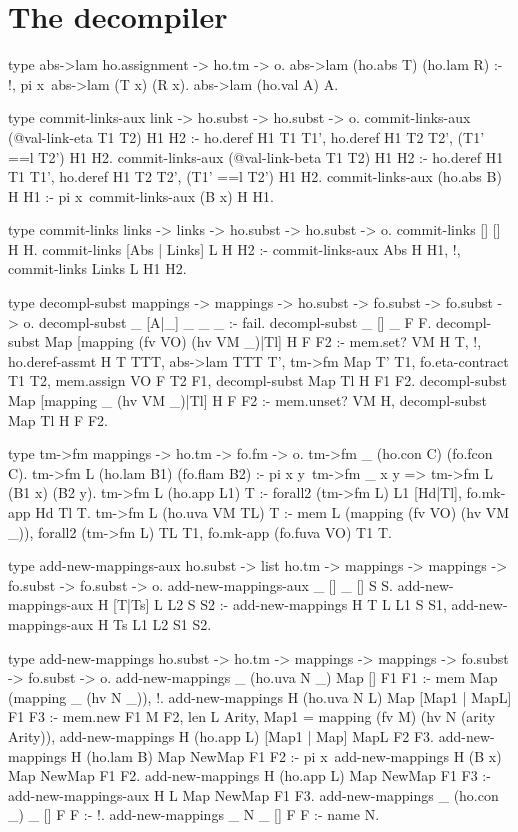 \section{The decompiler}

\begin{elpicode}
  
  type abs->lam ho.assignment -> ho.tm -> o.
  abs->lam (ho.abs T) (ho.lam R)  :- !, pi x\ abs->lam (T x) (R x).
  abs->lam (ho.val A) A.

  type commit-links-aux link -> ho.subst -> ho.subst -> o.
  commit-links-aux (@val-link-eta T1 T2) H1 H2 :- 
    ho.deref H1 T1 T1', ho.deref H1 T2 T2',
    (T1' ==l T2') H1 H2.
  commit-links-aux (@val-link-beta T1 T2) H1 H2 :- 
    ho.deref H1 T1 T1', ho.deref H1 T2 T2',
    (T1' ==l T2') H1 H2.
  commit-links-aux (ho.abs B) H H1 :- 
    pi x\ commit-links-aux (B x) H H1.

  type commit-links links -> links -> ho.subst -> ho.subst -> o.
  commit-links [] [] H H.
  commit-links [Abs | Links] L H H2 :- 
    commit-links-aux Abs H H1, !, commit-links Links L H1 H2.

  type decompl-subst mappings -> mappings -> ho.subst -> 
    fo.subst -> fo.subst -> o.
  decompl-subst _ [A|_] _ _ _ :- fail.
  decompl-subst _ [] _ F F.
  decompl-subst Map [mapping (fv VO) (hv VM _)|Tl] H F F2 :- 
    mem.set? VM H T, !, 
    ho.deref-assmt H T TTT,
    abs->lam TTT T', tm->fm Map T' T1, 
    fo.eta-contract T1 T2, mem.assign VO F T2 F1,
    decompl-subst Map Tl H F1 F2. 
  decompl-subst Map [mapping _ (hv VM _)|Tl] H F F2 :- 
    mem.unset? VM H, decompl-subst Map Tl H F F2.

  type tm->fm mappings -> ho.tm -> fo.fm -> o.
  tm->fm _ (ho.con C)  (fo.fcon C).
  tm->fm L (ho.lam B1) (fo.flam B2) :- 
    pi x y\ tm->fm _ x y => tm->fm L (B1 x) (B2 y).
  tm->fm L (ho.app L1) T :- forall2 (tm->fm L) L1 [Hd|Tl], 
    fo.mk-app Hd Tl T.
  tm->fm L (ho.uva VM TL) T :- mem L (mapping (fv VO) (hv VM _)), 
    forall2 (tm->fm L) TL T1, fo.mk-app (fo.fuva VO) T1 T.

  type add-new-mappings-aux ho.subst -> list ho.tm -> mappings -> 
        mappings ->  fo.subst -> fo.subst -> o.
  add-new-mappings-aux _ [] _ [] S S.
  add-new-mappings-aux H [T|Ts] L L2 S S2 :- 
    add-new-mappings H T L L1 S S1, 
    add-new-mappings-aux H Ts L1 L2 S1 S2.

  type add-new-mappings ho.subst -> ho.tm -> mappings -> 
      mappings ->  fo.subst -> fo.subst -> o.
  add-new-mappings _ (ho.uva N _) Map [] F1 F1 :- 
    mem Map (mapping _ (hv N _)), !.
  add-new-mappings H (ho.uva N L) Map [Map1 | MapL] F1 F3 :-
    mem.new F1 M F2,
    len L Arity, Map1 = mapping (fv M) (hv N (arity Arity)),
    add-new-mappings H (ho.app L) [Map1 | Map] MapL F2 F3.
  add-new-mappings H (ho.lam B) Map NewMap F1 F2 :- 
    pi x\ add-new-mappings H (B x) Map NewMap F1 F2.
  add-new-mappings H (ho.app L) Map NewMap F1 F3 :- 
    add-new-mappings-aux H L Map NewMap F1 F3.
  add-new-mappings _ (ho.con _) _ [] F F :- !.
  add-new-mappings _ N _ [] F F :- name N.


\end{elpicode}
